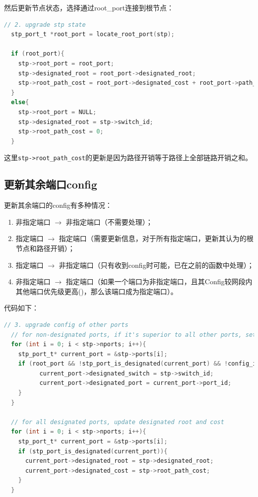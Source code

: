 \documentclass[UTF8]{report}
\begin{document}
然后更新节点状态，选择通过root\_port连接到根节点：

\begin{lstlisting}[language=C]
  // 2. upgrade stp state
  stp_port_t *root_port = locate_root_port(stp);

  if (root_port){
    stp->root_port = root_port;
    stp->designated_root = root_port->designated_root;
    stp->root_path_cost = root_port->designated_cost + root_port->path_cost;
  }
  else{
    stp->root_port = NULL;
    stp->designated_root = stp->switch_id;
    stp->root_path_cost = 0;
  }
\end{lstlisting}

这里\texttt{stp->root_path_cost}的更新是因为路径开销等于路径上全部链路开销之和。

\subsection{更新其余端口config}

更新其余端口的config有多种情况：

\begin{enumerate}
  \item 非指定端口 $\rightarrow$ 非指定端口（不需要处理）；
  \item 指定端口 $\rightarrow$ 指定端口（需要更新信息，对于所有指定端口，更新其认为的根节点和路径开销）；
  \item 指定端口 $\rightarrow$ 非指定端口（只有收到config时可能，已在之前的函数中处理）；
  \item 非指定端口 $\rightarrow$ 指定端口（如果一个端口为非指定端口，且其Config较网段内其他端口优先级更高()，那么该端口成为指定端口）。
\end{enumerate}

代码如下：

\begin{lstlisting}[language=C]
  // 3. upgrade config of other ports
  // for non-designated ports, if it's superior to all other ports, set it as designated
  for (int i = 0; i < stp->nports; i++){
    stp_port_t* current_port = &stp->ports[i];
    if (root_port && !stp_port_is_designated(current_port) && !config_is_superior(current_port, stp->designated_root, stp->root_path_cost, stp->switch_id, current_port->port_id)){
          current_port->designated_switch = stp->switch_id;
          current_port->designated_port = current_port->port_id;
    }
  }

  // for all designated ports, update designated root and cost
  for (int i = 0; i < stp->nports; i++){
    stp_port_t* current_port = &stp->ports[i];
    if (stp_port_is_designated(current_port)){
      current_port->designated_root = stp->designated_root;
      current_port->designated_cost = stp->root_path_cost;
    }
  }
\end{lstlisting}
\end{document}
